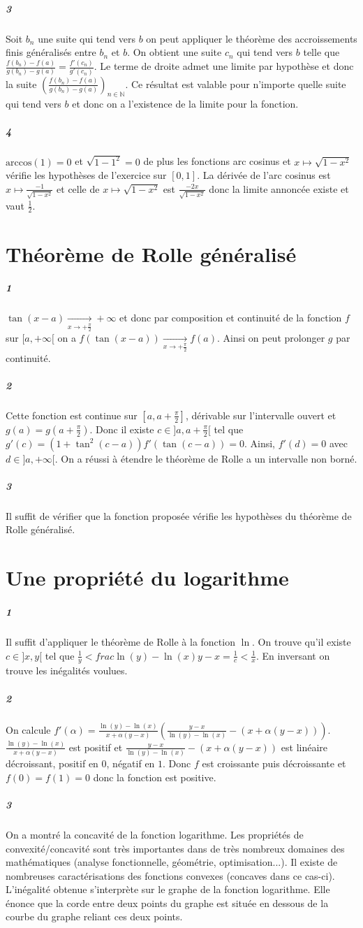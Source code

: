 \documentclass[10pt,a4paper]{article}
\begin{document}
\subparagraph{3}Soit $b_n$ une suite qui tend vers $b$ on peut appliquer le théorème des accroissements finis généralisés entre $b_n$ et $b$. On obtient une suite $c_n$ qui tend vers $b$ telle que $\frac{f(b_n)-f(a)}{g(b_n) - g(a)} = \frac{f'(c_n)}{g'(c_n)}$. Le terme de droite admet une limite par hypothèse et donc la suite $\left( \frac{f(b_n)-f(a)}{g(b_n) - g(a)}\right)_{n\in \mathbb{N}}$. Ce résultat est valable pour n'importe quelle suite qui tend vers $b$ et donc on a l'existence de la limite pour la fonction.

\subparagraph{4}$\text{arccos}(1) = 0$ et $\sqrt{1-1^2}=0$ de plus les fonctions arc cosinus et $x \mapsto \sqrt{1-x^2}$ vérifie les hypothèses de l'exercice sur $[0,1]$. La dérivée de l'arc cosinus est $x \mapsto \frac{-1}{\sqrt{1-x^2}}$ et celle de $x\mapsto \sqrt{1-x^2}$ est $\frac{-2x}{\sqrt{1-x^2}}$ donc la limite annoncée existe et vaut $\frac{1}{2}$.
 
\section{Théorème de Rolle généralisé}
\subparagraph{1}$\tan(x-a) \underset{x \rightarrow +\frac{\pi}{2}}{\rightarrow} +\infty$ et donc par composition et continuité de la fonction $f$ sur $[a,+\infty[$ on a $f(\tan(x-a)) \underset{x \rightarrow +\frac{\pi}{2}}{\rightarrow} f(a)$. Ainsi on peut prolonger $g$ par continuité.
\subparagraph{2}Cette fonction est continue sur $[a,a+\frac{\pi}{2}]$, dérivable sur l'intervalle ouvert et $g(a) = g(a+\frac{\pi}{2})$. Donc il existe $c \in ]a,a+\frac{\pi}{2}[$ tel que $g'(c) = (1+ \tan^2(c-a)) f'(\tan(c-a)) = 0$. Ainsi, $f'(d) = 0$ avec $d \in ]a,+\infty[$. On a réussi à étendre le théorème de Rolle a un intervalle non borné.
\subparagraph{3}Il suffit de vérifier que la fonction proposée vérifie les hypothèses du théorème de Rolle généralisé.

\section{Une propriété du logarithme}
\subparagraph{1} Il suffit d'appliquer le théorème de Rolle à la fonction $\ln$. On trouve qu'il existe $c \in ]x,y[$ tel que $\frac{1}{y} < frac{\ln(y) - \ln(x) }{y-x} = \frac{1}{c} < \frac{1}{x}$. En inversant on trouve les inégalités voulues.
\subparagraph{2} On calcule $f'(\alpha) = \frac{\ln(y) - \ln(x)}{x + \alpha(y-x)} \left( \frac{y-x}{\ln(y) - \ln(x)} -(x+ \alpha(y-x))\right)$. $\frac{\ln(y) - \ln(x)}{x + \alpha(y-x)}$ est positif et $\frac{y-x}{\ln(y) - \ln(x)} -(x+ \alpha(y-x))$ est linéaire décroissant, positif en $0$, négatif en $1$. Donc $f$ est croissante puis décroissante et $f(0) = f(1) = 0$ donc la fonction est positive.
\subparagraph{3}On a montré la concavité de la fonction logarithme. Les propriétés de convexité/concavité sont très importantes dans de très nombreux domaines des mathématiques (analyse fonctionnelle, géométrie, optimisation...). Il existe de nombreuses caractérisations des fonctions convexes (concaves dans ce cas-ci). L'inégalité obtenue s'interprète sur le graphe de la fonction logarithme. Elle énonce que la corde entre deux points du graphe est située en dessous de la courbe du graphe reliant ces deux points.
\end{document}
